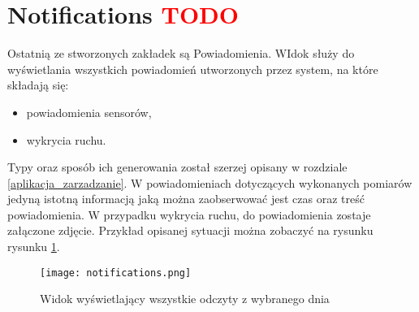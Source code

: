 \section{Notifications \textcolor{red}{TODO}}
Ostatnią ze stworzonych zakładek są Powiadomienia. WIdok służy do wyświetlania wszystkich powiadomień utworzonych przez system, na które składają się:
\begin{itemize}
\item powiadomienia sensorów,
\item wykrycia ruchu.
\end{itemize}
 Typy oraz sposób ich generowania został szerzej opisany w rozdziale \ref{aplikacja_zarzadzanie}. W powiadomieniach dotyczących wykonanych pomiarów jedyną istotną informacją jaką można zaobserwować jest czas oraz treść powiadomienia. W przypadku wykrycia ruchu, do powiadomienia zostaje załączone zdjęcie. Przykład opisanej sytuacji można zobaczyć na rysunku rysunku \ref{fig:notifications}.
\begin{figure}[H]
	\centering
	\texttt{[image: notifications.png]}
	\caption{Widok wyświetlający wszystkie odczyty z wybranego dnia}
	\label{fig:notifications}
\end{figure}